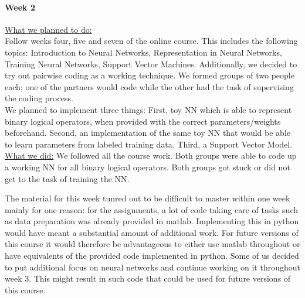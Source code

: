 \documentclass[•]{article}
\begin{document}
\paragraph{Week 2} \underline{What we planned to do:}\\
Follow weeks four, five and seven of the online course. This includes the following topics: Introduction to Neural Networks, Representation in Neural Networks, Training Neural Networks, Support Vector Machines. Additionally, we decided to try out pairwise coding as a working technique. We formed groups of two people each; one of the partners would code while the other had the task of supervising the coding process.\\
We planned to implement three things: First, toy NN which is able to represent binary logical operators, when provided with the correct parameters/weights beforehand. Second, an implementation of the same toy NN that would be able to learn parameters from labeled training data. Third, a Support Vector Model.\\
\underline{What we did:} We followed all the course work. Both groups were able to code up a working NN for all binary logical operators. Both groups got stuck or did not get to the task of training the NN.

 The material for this week tunred out to be difficult to master within one week mainly for one reason: for the assignments, a lot of code taking care of tasks such as data preparation was already provided in matlab. Implementing this in python would have meant a substantial amount of additional work. For future versions of this course it would therefore be advantageous to either use matlab throughout or have equivalents of the provided code implemented in python. Some of us decided to put additional focus on neural networks and continue working on it throughout week 3. This might result in such code that could be used for future versions of this course.
\end{document}
